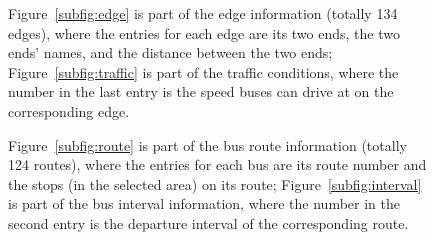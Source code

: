 \documentclass{sig-alternate}
\begin{document}
\begin{figure}
\centering
{}
\caption{Figure~\ref{subfig:edge} is part of the edge information (totally 134 edges), where the entries for each edge are its two ends, the two ends' names, and the distance between the two ends; Figure~\ref{subfig:traffic} is part of the traffic conditions, where the
number in the last entry is the speed buses can drive at on the corresponding edge.}
\label{fig:edge}
\end{figure}

\begin{figure}
\centering
{}
\caption{Figure~\ref{subfig:route} is part of the bus route information (totally 124 routes), where the entries for each bus are its route number and the stops (in the selected area) on its route; Figure~\ref{subfig:interval} is part of the bus interval information, where the
number in the second entry is the departure interval of the corresponding route.}
\label{fig:bus}
\end{figure}
\end{document}

